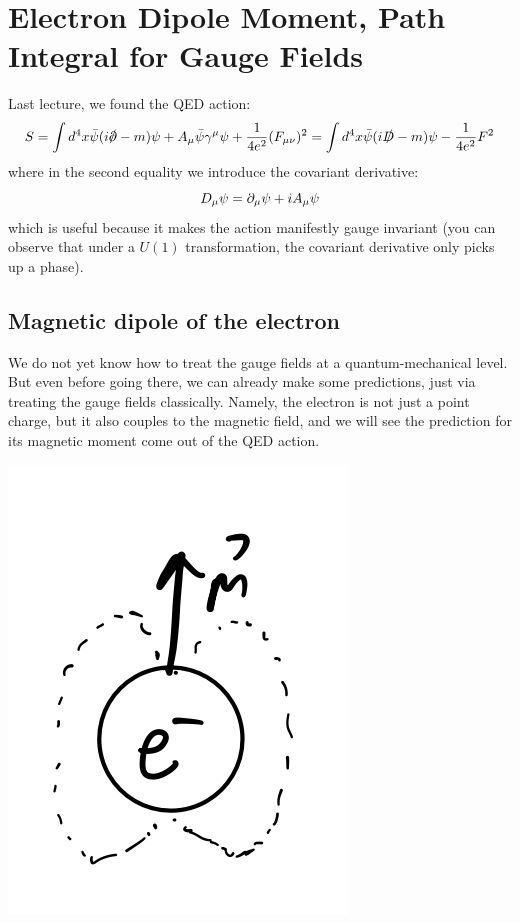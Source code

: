 \section{Electron Dipole Moment, Path Integral for Gauge Fields}
Last lecture, we found the QED action:
\begin{equation}
    S = \int d^4x \bar{\psi}(i\slashed{\p} - m)\psi + A_\mu \bar{\psi}\gamma^\mu \psi + \frac{1}{4e^2}(F_{\mu\nu})^2 = \int d^4x\bar{\psi}(i\slashed{D} - m)\psi - \frac{1}{4e^2}F^2
\end{equation}
where in the second equality we introduce the covariant derivative:
\begin{equation}
    D_\mu \psi = \partial_\mu \psi + iA_\mu \psi
\end{equation}
which is useful because it makes the action manifestly gauge invariant (you can observe that under a $U(1)$ transformation, the covariant derivative only picks up a phase).

\subsection{Magnetic dipole of the electron}
We do not yet know how to treat the gauge fields at a quantum-mechanical level. But even before going there, we can already make some predictions, just via treating the gauge fields classically. Namely, the electron is not just a point charge, but it also couples to the magnetic field, and we will see the prediction for its magnetic moment come out of the QED action.

\begin{center}
    \includegraphics[scale=0.35]{Lectures/Images/lec8-emagmoment.png}
\end{center}

